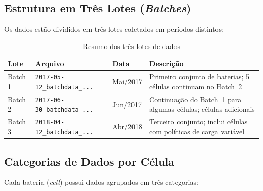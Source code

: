 \documentclass[12pt,a4paper]{article}
\begin{document}
\subsection{Estrutura em Tr\^{e}s Lotes (\textit{Batches})}

Os dados est\~ao divididos em tr\^{e}s lotes coletados em per\'{i}odos distintos:

\begin{table}[H]
\centering
\caption{Resumo dos tr\^{e}s lotes de dados}
\begin{tabular}{@{}lllp{6cm}@{}}
\toprule
\textbf{Lote} & \textbf{Arquivo} & \textbf{Data} & \textbf{Descri\c{c}\~ao} \\
\midrule
Batch 1 & \texttt{2017-05-12\_batchdata\_...} & Mai/2017 &
  Primeiro conjunto de baterias; 5 c\'{e}lulas continuam no Batch~2 \\
Batch 2 & \texttt{2017-06-30\_batchdata\_...} & Jun/2017 &
  Continua\c{c}\~ao do Batch~1 para algumas c\'{e}lulas; c\'{e}lulas adicionais \\
Batch 3 & \texttt{2018-04-12\_batchdata\_...} & Abr/2018 &
  Terceiro conjunto; inclui c\'{e}lulas com pol\'{i}ticas de carga vari\'{a}vel \\
\bottomrule
\end{tabular}
\end{table}

\subsection{Categorias de Dados por C\'{e}lula}

Cada bateria (\textit{cell}) possui dados agrupados em tr\^{e}s categorias:
\end{document}
